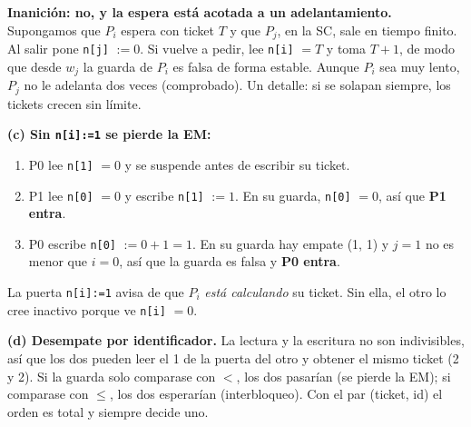 \documentclass[11pt,a4paper,oneside]{report}
\begin{document}
\begin{solucion}
\textbf{Inanición: no, y la espera está acotada a un adelantamiento.} Supongamos que $P_i$ espera con ticket $T$ y
que $P_j$, en la SC, sale en tiempo finito. Al salir pone \texttt{n[j]} $:= 0$. Si vuelve a pedir, lee
\texttt{n[i]} $= T$ y toma $T + 1$, de modo que desde $w_j$ la guarda de $P_i$ es falsa de forma estable. Aunque
$P_i$ sea muy lento, $P_j$ no le adelanta dos veces (comprobado). Un detalle: si se solapan siempre, los tickets
crecen sin límite.

\textbf{(c) Sin \texttt{n[i]:=1} se pierde la EM:}
\begin{enumerate}[leftmargin=*,noitemsep]
  \item P0 lee \texttt{n[1]} $= 0$ y se suspende antes de escribir su ticket.
  \item P1 lee \texttt{n[0]} $= 0$ y escribe \texttt{n[1]} $:= 1$. En su guarda, \texttt{n[0]} $= 0$, así que
        \textbf{P1 entra}.
  \item P0 escribe \texttt{n[0]} $:= 0 + 1 = 1$. En su guarda hay empate (1, 1) y $j = 1$ no es menor que $i = 0$,
        así que la guarda es falsa y \textbf{P0 entra}.
\end{enumerate}
La puerta \texttt{n[i]:=1} avisa de que $P_i$ \emph{está calculando} su ticket. Sin ella, el otro lo cree inactivo
porque ve \texttt{n[i]} $= 0$.

\textbf{(d) Desempate por identificador.} La lectura y la escritura no son indivisibles, así que los dos pueden
leer el 1 de la puerta del otro y obtener el mismo ticket (2 y 2). Si la guarda solo comparase con $<$, los dos
pasarían (se pierde la EM); si comparase con $\le$, los dos esperarían (interbloqueo). Con el par (ticket, id) el
orden es total y siempre decide uno.
\end{solucion}
\end{document}
